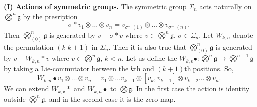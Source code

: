 \documentclass[11pt,a4paper]{amsart}
\newcommand{\botimes}{{\textstyle\bigotimes}}
\theoremstyle{definition}
\theoremstyle{plain}
\begin{document}
\textbf{(I) Actions of symmetric groups.}
The symmetric group $\Sigma_n$ acts naturally on $\botimes^n\mathfrak g$
by the presription
\[\sigma*v_1\otimes\ldots\otimes v_n=v_{\sigma^{-1}(1)}\otimes\ldots\otimes v_{\sigma^{-1}(n)}.\]
Then $\botimes^n_{(0)}\mathfrak g$ is generated by $v-\sigma*v$ where $v\in \botimes^n\mathfrak g$, $\sigma\in\Sigma_n$.
Let $W_{k,n}$ denote the permutation $(k\,\,k+1)$ in $\Sigma_n$.
Then it is also true that  $\botimes^n_{(0)}\mathfrak g$ is generated by $v-W_{k,n}*v$ where $v\in \botimes^n\mathfrak g$, $k<n$.
Let us define the $W_{k,n}\bullet:\botimes^n\mathfrak g\rightarrow\botimes^{n-1}\mathfrak g$ by taking a Lie-commutator
between the $k$th and $(k+1)$th positions. So,
\[W_{k,n}\bullet v_1\otimes\ldots\otimes v_n=v_1\otimes\ldots v_{k-1}\otimes[v_k,v_{k+1}]\otimes v_{k+2}\ldots\otimes v_n.\]
We can extend $W_{k,n}* $  and  $W_{k,n}\bullet $ to $\bigotimes\mathfrak g$.
In the first case the action is identity outside $\botimes^n\mathfrak g$, and in the second case it is the zero map.
\end{document}
